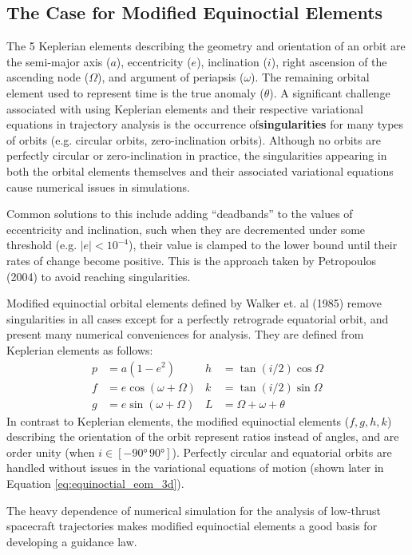 \subsection{The Case for Modified Equinoctial Elements}
The 5 Keplerian elements describing the geometry and orientation of an orbit are the semi-major axis (\(a\)), eccentricity (\(e\)), inclination (\(i\)), right ascension of the ascending node (\(\Omega\)), and argument of periapsis (\(\omega\)). The remaining orbital element used to represent time is the true anomaly (\(\theta\)). A significant challenge associated with using Keplerian elements and their respective variational equations in trajectory analysis is the occurrence of\textbf{singularities} for many types of orbits (e.g. circular orbits, zero-inclination orbits). Although no orbits are perfectly circular or zero-inclination in practice, the singularities appearing in both the orbital elements themselves and their associated variational equations cause numerical issues in simulations.

Common solutions to this include adding ``deadbands'' to the values of eccentricity and inclination, such when they are decremented under some threshold (e.g. \(|e| < 10^{-4}\)), their value is clamped to the lower bound until their rates of change become positive. This is the approach taken by Petropoulos (2004) \cite{petropoulos2004low} to avoid reaching singularities.

Modified equinoctial orbital elements defined by Walker et. al (1985) \cite{walker1985set} remove singularities in all cases except for a perfectly retrograde equatorial orbit, and present many numerical conveniences for analysis. They are defined from Keplerian elements as follows:
\begin{align*}
  p & = a \left(1-e^2\right)    & h & = \tan(i/2) \cos \Omega    \\
  f & = e \cos(\omega + \Omega) & k & = \tan(i/2) \sin \Omega    \\
  g & = e \sin(\omega + \Omega) & L & = \Omega + \omega + \theta
\end{align*}
In contrast to Keplerian elements, the modified equinoctial elements (\(f, g, h, k\)) describing the orientation of the orbit represent ratios instead of angles, and are order unity (when \(i \in [-\ang{90}\, \ang{90}]\)). Perfectly circular and equatorial orbits are handled without issues in the variational equations of motion (shown later in Equation \ref{eq:equinoctial_eom_3d}).

The heavy dependence of numerical simulation for the analysis of low-thrust spacecraft trajectories makes modified equinoctial elements a good basis for developing a guidance law.

